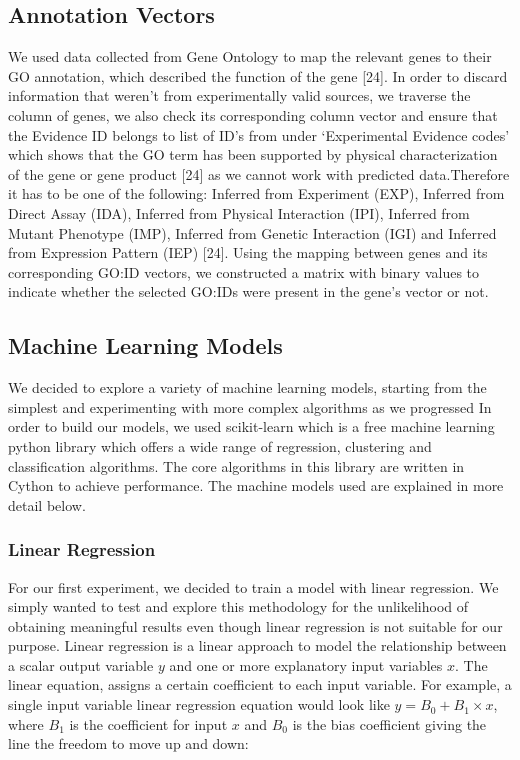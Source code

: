 \documentclass[9pt]{article}
\begin{document}
\subsection{Annotation Vectors}
We used data collected from Gene Ontology to map the relevant genes to their GO annotation, which described the function of the gene [24].
In order to discard information that weren’t from experimentally valid sources, we traverse the column of genes, we also check its corresponding column vector and ensure that the Evidence ID belongs to list of ID’s from under ‘Experimental Evidence codes’ which shows that the GO term has been supported by physical characterization of the gene or gene product [24] as we cannot work with predicted data.Therefore it has to be one of the following: Inferred from Experiment (EXP), Inferred from Direct Assay (IDA), Inferred from Physical Interaction (IPI), Inferred from Mutant Phenotype (IMP), Inferred from Genetic Interaction (IGI) and Inferred from Expression Pattern (IEP) [24]. Using the mapping between genes and its corresponding GO:ID vectors, we constructed a matrix with binary values to indicate whether the selected GO:IDs were present in the gene’s vector or not.

\subsection{Machine Learning Models}
We decided to explore a variety of machine learning models, starting from the simplest and experimenting with more complex algorithms as we progressed In order to build our models, we used scikit-learn which is a free machine learning python library which offers a wide range of regression, clustering and classification algorithms. The core algorithms in this library are written in Cython to achieve performance. The machine models used are explained in more detail below. 

\subsubsection{Linear Regression}
For our first experiment, we decided to train a model with linear regression. We simply wanted to test and explore this methodology for the unlikelihood of obtaining meaningful results even though linear regression is not suitable for our purpose. Linear regression is a linear approach to model the relationship between a scalar output variable \(y\) and one or more explanatory input variables \(x\). The linear equation, assigns a certain coefficient to each input variable. For example, a single input variable linear regression equation would look like $y = B_0 + B_1\times{x}$, where \(B_1\) is the coefficient for input \(x\) and \(B_0\) is the bias coefficient giving the line the freedom to move up and down: 
\end{document}
